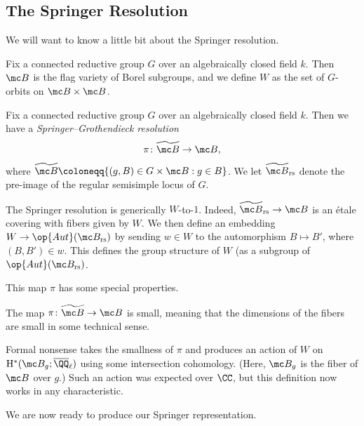 \documentclass[../notes.tex]{subfiles}
\begin{document}
\subsection{The Springer Resolution}
We will want to know a little bit about the Springer resolution.
\begin{notation}
	Fix a connected reductive group $G$ over an algebraically closed field $k$. Then $\mc B$ is the flag variety of Borel subgroups, and we define $W$ as the set of $G$-orbits on $\mc B\times\mc B$.
\end{notation}
\begin{definition}
	Fix a connected reductive group $G$ over an algebraically closed field $k$. Then we have a \textit{Springer--Grothendieck resolution}
	\[\pi\colon\widetilde{\mc B}\to\mc B,\]
	where $\widetilde{\mc B}\coloneqq\{(g,B)\in G\times\mc B:g\in B\}$. We let $\widetilde{\mc B}_{\mathrm{rs}}$ denote the pre-image of the regular semisimple locus of $G$.
\end{definition}
\begin{remark}
	The Springer resolution is generically $W$-to-$1$. Indeed, $\widetilde{\mc B}_{\mathrm{rs}}\to\mc B$ is an \'etale covering with fibers given by $W$. We then define an embedding $W\to\op{Aut}(\mc B_{\mathrm{rs}})$ by sending $w\in W$ to the automorphism $B\mapsto B'$, where $(B,B')\in w$. This defines the group structure of $W$ (as a subgroup of $\op{Aut}(\mc B_{\mathrm{rs}})$.
\end{remark}
This map $\pi$ has some special properties.
\begin{theorem}[Lusztig]
	The map $\pi\colon\widetilde{\mc B}\to\mc B$ is small, meaning that the dimensions of the fibers are small in some technical sense.
\end{theorem}
\begin{remark}
	Formal nonsense takes the smallness of $\pi$ and produces an action of $W$ on $\mathrm H^*(\mc B_g;\overline\QQ_\ell)$ using some intersection cohomology. (Here, $\mc B_g$ is the fiber of $\mc B$ over $g$.) Such an action was expected over $\CC$, but this definition now works in any characteristic.
\end{remark}
We are now ready to produce our Springer representation.
\end{document}
